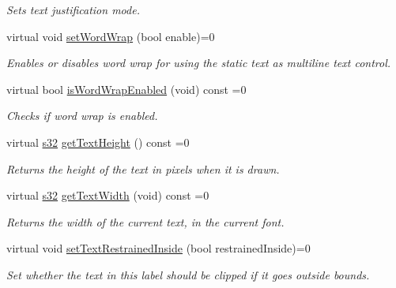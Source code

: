 \begin{DoxyCompactItemize}
\begin{DoxyCompactList}\small\item\em Sets text justification mode. \end{DoxyCompactList}\item 
virtual void \hyperlink{classirr_1_1gui_1_1IGUIStaticText_a2a47bc2f85ced3efc1d007c5bd61f906}{set\+Word\+Wrap} (bool enable)=0
\begin{DoxyCompactList}\small\item\em Enables or disables word wrap for using the static text as multiline text control. \end{DoxyCompactList}\item 
virtual bool \hyperlink{classirr_1_1gui_1_1IGUIStaticText_a42d7fbdb196414a1d95146b53e6a3528}{is\+Word\+Wrap\+Enabled} (void) const =0
\begin{DoxyCompactList}\small\item\em Checks if word wrap is enabled. \end{DoxyCompactList}\item 
virtual \hyperlink{namespaceirr_ac66849b7a6ed16e30ebede579f9b47c6}{s32} \hyperlink{classirr_1_1gui_1_1IGUIStaticText_a88e90c238601f17e1f0b0d79c7dc1004}{get\+Text\+Height} () const =0
\begin{DoxyCompactList}\small\item\em Returns the height of the text in pixels when it is drawn. \end{DoxyCompactList}\item 
virtual \hyperlink{namespaceirr_ac66849b7a6ed16e30ebede579f9b47c6}{s32} \hyperlink{classirr_1_1gui_1_1IGUIStaticText_adcfbe869b6c0ab409bbde51d4cba7e5d}{get\+Text\+Width} (void) const =0
\begin{DoxyCompactList}\small\item\em Returns the width of the current text, in the current font. \end{DoxyCompactList}\item 
\mbox{\label{classirr_1_1gui_1_1IGUIStaticText_aaec565b5b45581470d4e524c2efac1b6}} 
virtual void \hyperlink{classirr_1_1gui_1_1IGUIStaticText_aaec565b5b45581470d4e524c2efac1b6}{set\+Text\+Restrained\+Inside} (bool restrained\+Inside)=0
\begin{DoxyCompactList}\small\item\em Set whether the text in this label should be clipped if it goes outside bounds. \end{DoxyCompactList}\item 

\end{DoxyCompactItemize}
